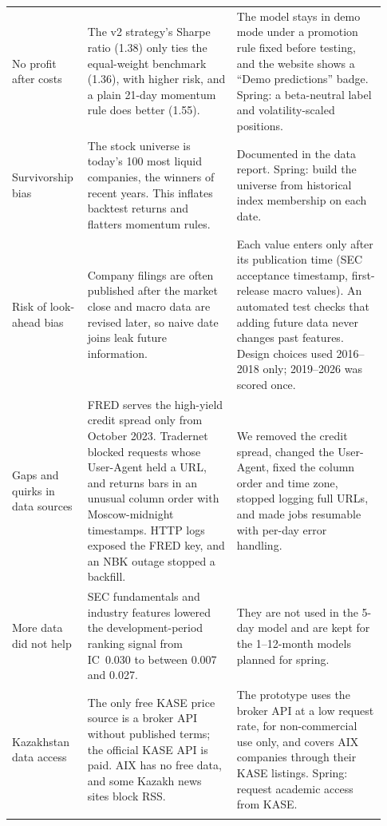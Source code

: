 {\begin{longtable}{@{}>{\raggedright\arraybackslash}p{0.17\linewidth}
                    >{\raggedright\arraybackslash}p{0.38\linewidth}
                    >{\raggedright\arraybackslash}p{0.38\linewidth}@{}}
No profit after costs &
The v2 strategy's Sharpe ratio (1.38) only ties the equal-weight benchmark
(1.36), with higher risk, and a plain 21-day momentum rule does better (1.55). &
The model stays in demo mode under a promotion rule fixed before testing, and
the website shows a ``Demo predictions'' badge. Spring: a beta-neutral label and
volatility-scaled positions. \\
\addlinespace

Survivorship bias &
The stock universe is today's 100 most liquid companies, the winners of recent
years. This inflates backtest returns and flatters momentum rules. &
Documented in the data report. Spring: build the universe from historical index
membership on each date. \\
\addlinespace

Risk of look-ahead bias &
Company filings are often published after the market close and macro data are
revised later, so naive date joins leak future information. &
Each value enters only after its publication time (SEC acceptance timestamp,
first-release macro values). An automated test checks that adding future data
never changes past features. Design choices used 2016--2018 only; 2019--2026
was scored once. \\
\addlinespace

Gaps and quirks in data sources &
FRED serves the high-yield credit spread only from October 2023. Tradernet
blocked requests whose User-Agent held a URL, and returns bars in an unusual
column order with Moscow-midnight timestamps. HTTP logs exposed the FRED key,
and an NBK outage stopped a backfill. &
We removed the credit spread, changed the User-Agent, fixed the column order
and time zone, stopped logging full URLs, and made jobs resumable with per-day
error handling. \\
\addlinespace

More data did not help &
SEC fundamentals and industry features lowered the development-period ranking
signal from IC~0.030 to between 0.007 and 0.027. &
They are not used in the 5-day model and are kept for the 1--12-month models
planned for spring. \\
\addlinespace

Kazakhstan data access &
The only free KASE price source is a broker API without published terms; the
official KASE API is paid. AIX has no free data, and some Kazakh news sites
block RSS. &
The prototype uses the broker API at a low request rate, for non-commercial use
only, and covers AIX companies through their KASE listings. Spring: request
academic access from KASE. \\
\addlinespace


\end{longtable}}

